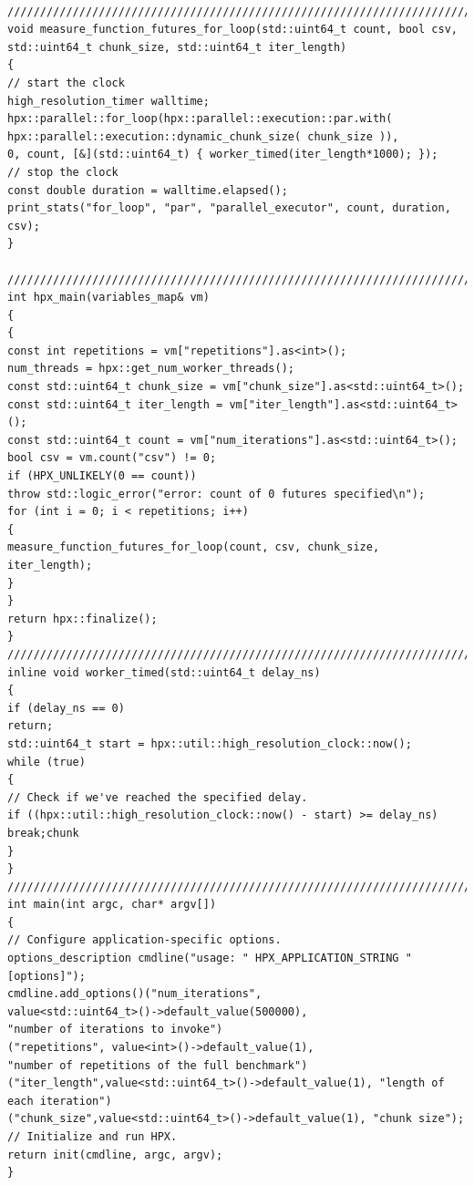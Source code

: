 \begin{lstlisting}[basicstyle=\fontsize{8}{9}\selectfont,float,floatplacement=H,caption= {A simple hpx for\textunderscore{loop} used to study the effect of grain size on the achieved parallelism.}, label={hpx_for_loop}]

///////////////////////////////////////////////////////////////////////////////
void measure_function_futures_for_loop(std::uint64_t count, bool csv, std::uint64_t chunk_size, std::uint64_t iter_length)
{
// start the clock
high_resolution_timer walltime;
hpx::parallel::for_loop(hpx::parallel::execution::par.with(
hpx::parallel::execution::dynamic_chunk_size( chunk_size )),
0, count, [&](std::uint64_t) { worker_timed(iter_length*1000); });
// stop the clock
const double duration = walltime.elapsed();
print_stats("for_loop", "par", "parallel_executor", count, duration, csv);
}

///////////////////////////////////////////////////////////////////////////////
int hpx_main(variables_map& vm)
{
{
const int repetitions = vm["repetitions"].as<int>();
num_threads = hpx::get_num_worker_threads();
const std::uint64_t chunk_size = vm["chunk_size"].as<std::uint64_t>();
const std::uint64_t iter_length = vm["iter_length"].as<std::uint64_t>();
const std::uint64_t count = vm["num_iterations"].as<std::uint64_t>();
bool csv = vm.count("csv") != 0;
if (HPX_UNLIKELY(0 == count))
throw std::logic_error("error: count of 0 futures specified\n");
for (int i = 0; i < repetitions; i++)
{
measure_function_futures_for_loop(count, csv, chunk_size, iter_length);
}
}
return hpx::finalize();
}
///////////////////////////////////////////////////////////////////////////////
inline void worker_timed(std::uint64_t delay_ns)
{
if (delay_ns == 0)
return;
std::uint64_t start = hpx::util::high_resolution_clock::now();
while (true)
{
// Check if we've reached the specified delay.
if ((hpx::util::high_resolution_clock::now() - start) >= delay_ns)
break;chunk
}
}
///////////////////////////////////////////////////////////////////////////////
int main(int argc, char* argv[])
{
// Configure application-specific options.
options_description cmdline("usage: " HPX_APPLICATION_STRING " [options]");
cmdline.add_options()("num_iterations",
value<std::uint64_t>()->default_value(500000),
"number of iterations to invoke")
("repetitions", value<int>()->default_value(1),
"number of repetitions of the full benchmark")
("iter_length",value<std::uint64_t>()->default_value(1), "length of each iteration")
("chunk_size",value<std::uint64_t>()->default_value(1), "chunk size");
// Initialize and run HPX.
return init(cmdline, argc, argv);
}
\end{lstlisting}

